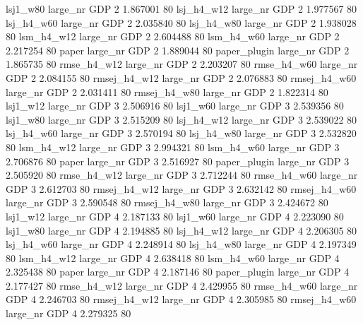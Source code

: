     lsj1_w80   large_nr      GDP                 2 1.867001 80
  lsj_h4_w12   large_nr      GDP                 2 1.977567 80
  lsj_h4_w60   large_nr      GDP                 2 2.035840 80
  lsj_h4_w80   large_nr      GDP                 2 1.938028 80
  lsm_h4_w12   large_nr      GDP                 2 2.604488 80
  lsm_h4_w60   large_nr      GDP                 2 2.217254 80
       paper   large_nr      GDP                 2 1.889044 80
paper_plugin   large_nr      GDP                 2 1.865735 80
 rmse_h4_w12   large_nr      GDP                 2 2.203207 80
 rmse_h4_w60   large_nr      GDP                 2 2.084155 80
rmsej_h4_w12   large_nr      GDP                 2 2.076883 80
rmsej_h4_w60   large_nr      GDP                 2 2.031411 80
rmsej_h4_w80   large_nr      GDP                 2 1.822314 80
    lsj1_w12   large_nr      GDP                 3 2.506916 80
    lsj1_w60   large_nr      GDP                 3 2.539356 80
    lsj1_w80   large_nr      GDP                 3 2.515209 80
  lsj_h4_w12   large_nr      GDP                 3 2.539022 80
  lsj_h4_w60   large_nr      GDP                 3 2.570194 80
  lsj_h4_w80   large_nr      GDP                 3 2.532820 80
  lsm_h4_w12   large_nr      GDP                 3 2.994321 80
  lsm_h4_w60   large_nr      GDP                 3 2.706876 80
       paper   large_nr      GDP                 3 2.516927 80
paper_plugin   large_nr      GDP                 3 2.505920 80
 rmse_h4_w12   large_nr      GDP                 3 2.712244 80
 rmse_h4_w60   large_nr      GDP                 3 2.612703 80
rmsej_h4_w12   large_nr      GDP                 3 2.632142 80
rmsej_h4_w60   large_nr      GDP                 3 2.590548 80
rmsej_h4_w80   large_nr      GDP                 3 2.424672 80
    lsj1_w12   large_nr      GDP                 4 2.187133 80
    lsj1_w60   large_nr      GDP                 4 2.223090 80
    lsj1_w80   large_nr      GDP                 4 2.194885 80
  lsj_h4_w12   large_nr      GDP                 4 2.206305 80
  lsj_h4_w60   large_nr      GDP                 4 2.248914 80
  lsj_h4_w80   large_nr      GDP                 4 2.197349 80
  lsm_h4_w12   large_nr      GDP                 4 2.638418 80
  lsm_h4_w60   large_nr      GDP                 4 2.325438 80
       paper   large_nr      GDP                 4 2.187146 80
paper_plugin   large_nr      GDP                 4 2.177427 80
 rmse_h4_w12   large_nr      GDP                 4 2.429955 80
 rmse_h4_w60   large_nr      GDP                 4 2.246703 80
rmsej_h4_w12   large_nr      GDP                 4 2.305985 80
rmsej_h4_w60   large_nr      GDP                 4 2.279325 80
